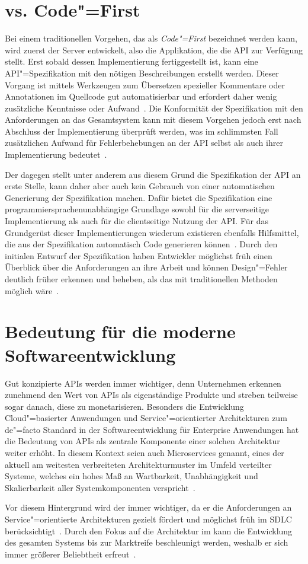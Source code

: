\section{\AF vs. Code"=First}
Bei einem traditionellen Vorgehen, das als \emph{Code"=First} bezeichnet werden kann, wird zuerst der Server entwickelt, also die Applikation, die die \ac{API} zur Verfügung stellt.
Erst sobald dessen Implementierung fertiggestellt ist, kann eine \ac{API}"=Spezifikation mit den nötigen Beschreibungen erstellt werden.
Dieser Vorgang ist mittels Werkzeugen zum Übersetzen spezieller Kommentare oder Annotationen im Quellcode gut automatisierbar und erfordert daher wenig zusätzliche Kenntnisse oder Aufwand~\cite{ope24}.
Die Konformität der Spezifikation mit den Anforderungen an das Gesamtsystem kann mit diesem Vorgehen jedoch erst nach Abschluss der Implementierung überprüft werden, was im schlimmsten Fall zusätzlichen Aufwand für Fehlerbehebungen an der \ac{API} selbst als auch ihrer Implementierung bedeutet~\cite{vol22}.

Der \AFA dagegen stellt unter anderem aus diesem Grund die Spezifikation der \ac{API} an erste Stelle, kann daher aber auch kein Gebrauch von einer automatischen Generierung der Spezifikation machen.
Dafür bietet die Spezifikation eine programmiersprachenunabhängige Grundlage sowohl für die serverseitige Implementierung als auch für die clientseitige Nutzung der \ac{API}.
Für das Grundgerüst dieser Implementierungen wiederum existieren ebenfalls Hilfsmittel, die aus der Spezifikation automatisch Code generieren können~\cite{ope24}.
Durch den initialen Entwurf der Spezifikation haben Entwickler möglichst früh einen Überblick über die Anforderungen an ihre Arbeit und können Design"=Fehler deutlich früher erkennen und beheben, als das mit traditionellen Methoden möglich wäre~\cite[1627]{cha21}.

\section{Bedeutung für die moderne Softwareentwicklung}
Gut konzipierte \acp{API} werden immer wichtiger, denn Unternehmen erkennen zunehmend den Wert von \acp{API} als eigenständige Produkte und streben teilweise sogar danach, diese zu monetarisieren.
Besonders die Entwicklung Cloud"=basierter Anwendungen und Service"=orientierter Architekturen zum de"=facto Standard in der Softwareentwicklung für Enterprise Anwendungen hat die Bedeutung von \acp{API} als zentrale Komponente einer solchen Architektur weiter erhöht.
In diesem Kontext seien auch Microservices genannt, eines der aktuell am weitesten verbreiteten Architekturmuster im Umfeld verteilter Systeme, welches ein hohes Maß an Wartbarkeit, Unabhängigkeit und Skalierbarkeit aller Systemkomponenten verspricht~\cites[73-75]{bea22}[5]{kul23}.

Vor diesem Hintergrund wird der \AFA immer wichtiger, da er die Anforderungen an Service"=orientierte Architekturen gezielt fördert und möglichst früh im \ac{SDLC} berücksichtigt~\cite[1627]{cha21}.
Durch den Fokus auf die Architektur im \AFA kann die Entwicklung des gesamten Systems bis zur Marktreife beschleunigt werden, weshalb er sich immer größerer Beliebtheit erfreut~\cite[76]{bea22}.